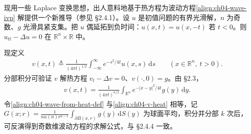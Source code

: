 \documentclass[../../main.tex]{subfiles}
\begin{document}
\begin{example}[由热方程导出波动方程]\label{example:ch04-wave-from-heat}现用一些 Laplace 变换思想，出人意料地基于热方程为波动方程\eqref{align:ch04-wave-ivp} 解提供一个新推导（参见 \S2.4.1）。设 $u$ 是初值问题的有界光滑解，$n$ 为奇数、$g$ 光滑具紧支集。把 $u$ 偶延拓到负时间：$u(x,t)=u(x,-t)$ 若 $t<0$。则 $u_{tt}-\Delta u=0$ 在 $\mathbb{R}^n\times\mathbb{R}$ 中。

现定义
\begin{align}\label{align:ch04-wave-from-heat-def}
v(x,t)\triangleq\frac{1}{(4\pi t)^{1/2}}\int_{-\infty}^\infty e^{-s^2/4t}u(x,s)\,\mathrm{d}s \qquad(x\in\mathbb{R}^n,\ t>0).
\end{align}
分部积分可验证 $v$ 解热方程 $v_t-\Delta v=0$、$v(\cdot,0)=g$。由 \S2.3，
\begin{align}\label{align:ch04-v-heat}
v(x,t)=\frac{1}{(4\pi t)^{n/2}}\int_{\mathbb{R}^n}e^{-|x-y|^2/4t}g(y)\,\mathrm{d}y.
\end{align}
令\eqref{align:ch04-wave-from-heat-def} 与\eqref{align:ch04-v-heat} 相等，记 $G(x;r)=\frac{1}{n\alpha(n)r^{n-1}}\int_{\partial B(x,r)}g(y)\,\mathrm{d}S(y)$ 为球面平均，积分并分部 $k$ 次后，可反演得到奇数维波动方程的求解公式，与 \S2.4.4 一致。
\end{example}
\end{document}
